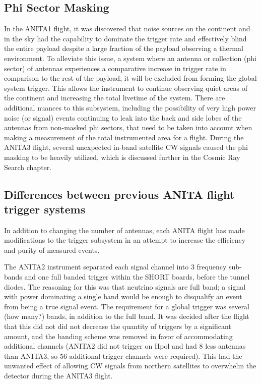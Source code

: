 	\subsection{Phi Sector Masking}
		In the ANITA1 flight, it was discovered that noise sources on the continent and in the sky had the capability to dominate the trigger rate and effectively blind the entire payload despite a large fraction of the payload observing a thermal environment. To alleviate this issue, a system where an antenna or collection (phi sector) of antennas experiences a comparative increase in trigger rate in comparison to the rest of the payload, it will be excluded from forming the global system trigger.  This allows the instrument to continue observing quiet areas of the continent and increasing the total livetime of the system.  There are additional nuances to this subsystem, including the possibility of very high power noise (or signal) events continuing to leak into the back and side lobes of the antennas from non-masked phi sectors, that need to be taken into account when making a measurement of the total instrumented area for a flight.  During the ANITA3 flight, several unexpected in-band satellite CW signals caused the phi masking to be heavily utilized, which is discussed further in the Cosmic Ray Search chapter.
		
	\subsection{Differences between previous ANITA flight trigger systems}
		In addition to changing the number of antennas, each ANITA flight has made modifications to the trigger subsystem in an attempt to increase the efficiency and purity of measured events.
		
		The ANITA2 instrument separated each signal channel into 3 frequency sub-bands and one full banded trigger within the SHORT boards, before the tunnel diodes.  The reasoning for this was that neutrino signals are full band; a signal with power dominating a single band would be enough to disqualify an event from being a true signal event.  The requirement for a global trigger was several (how many?) bands, in addition to the full band.  It was decided after the flight that this did not did not decrease the quantity of triggers by a significant amount, and the banding scheme was removed in favor of accommodating additional channels (ANITA2 did not trigger on Hpol and had 8 less antennas than ANITA3, so 56 additional trigger channels were required).  This had the unwanted effect of allowing CW signals from northern satellites to overwhelm the detector during the ANITA3 flight.
		
